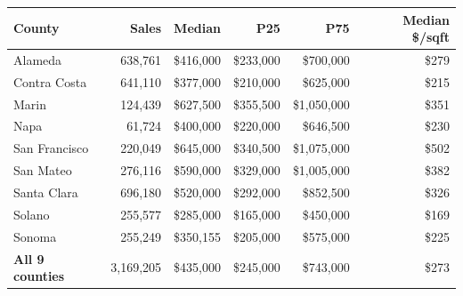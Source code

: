 \begin{tabular}{lrrrrr}
\toprule
County & Sales & Median & P25 & P75 & Median \$/sqft \\
\midrule
Alameda & 638,761 & \$416,000 & \$233,000 & \$700,000 & \$279 \\
Contra Costa & 641,110 & \$377,000 & \$210,000 & \$625,000 & \$215 \\
Marin & 124,439 & \$627,500 & \$355,500 & \$1,050,000 & \$351 \\
Napa & 61,724 & \$400,000 & \$220,000 & \$646,500 & \$230 \\
San Francisco & 220,049 & \$645,000 & \$340,500 & \$1,075,000 & \$502 \\
San Mateo & 276,116 & \$590,000 & \$329,000 & \$1,005,000 & \$382 \\
Santa Clara & 696,180 & \$520,000 & \$292,000 & \$852,500 & \$326 \\
Solano & 255,577 & \$285,000 & \$165,000 & \$450,000 & \$169 \\
Sonoma & 255,249 & \$350,155 & \$205,000 & \$575,000 & \$225 \\
\midrule
\textbf{All 9 counties} & 3,169,205 & \$435,000 & \$245,000 & \$743,000 & \$273 \\
\bottomrule
\end{tabular}
